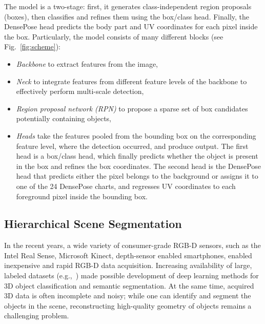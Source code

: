 The model is a two-stage: first, it generates class-independent region proposals (boxes), then classifies and refines them using the box/class head. Finally, the DensePose head predicts the body part and UV coordinates for each pixel inside the box. Particularly, the model consists of many different blocks (see Fig.~\ref{fig:scheme}):
\begin{itemize}
    \item \textit{Backbone} to extract features from the image,
    \item \textit{Neck} to integrate features from different feature levels of the backbone to effectively perform multi-scale detection,
    \item \textit{Region proposal network (RPN)} to propose a sparse set of box candidates potentially containing objects,
    \item \textit{Heads} take the features pooled from the bounding box on the corresponding feature level, where the detection occurred, and produce output. The first head is a box/class head, which finally predicts whether the object is present in the box and refines the box coordinates. The second head is the DensePose head that predicts either the pixel belongs to the background or assigns it to one of the 24 DensePose charts, and regresses UV coordinates to each foreground pixel inside the bounding box.
\end{itemize}

\subsection{Hierarchical Scene Segmentation}

In the recent years, a wide variety of consumer-grade RGB-D sensors, such as the Intel Real Sense, Microsoft Kinect, depth-sensor enabled smartphones, enabled inexpensive and rapid RGB-D data acquisition. Increasing availability of large, labeled datasets (e.g.,~\cite{chang2017matterport3d,dai2017scannet})  made possible development of deep learning methods for 3D object classification and semantic segmentation. At the same time, acquired 3D data is often incomplete and noisy; while one can identify and segment the objects in the scene, reconstructing high-quality geometry of objects remains a challenging problem.  

